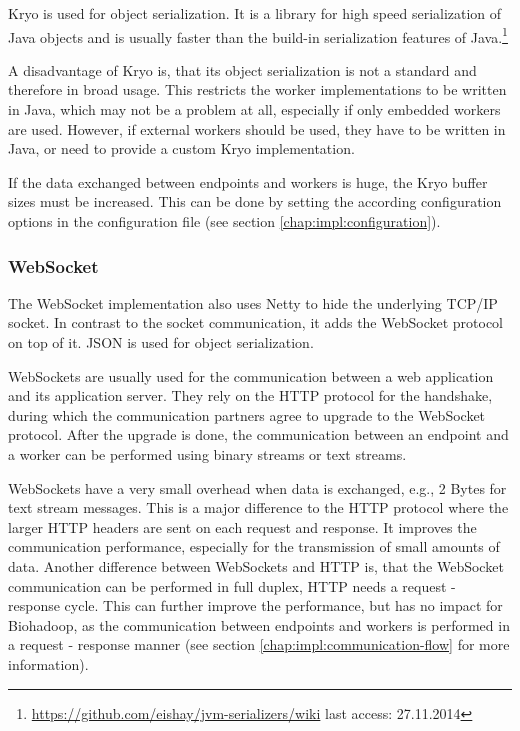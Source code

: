 Kryo is used for object serialization. It is a library for high speed serialization of Java objects and is usually faster than the build-in serialization features of Java.\footnote{\url{https://github.com/eishay/jvm-serializers/wiki} last access: 27.11.2014}

A disadvantage of Kryo is, that its object serialization is not a standard and therefore in broad usage. This restricts the worker implementations to be written in Java, which may not be a problem at all, especially if only embedded workers are used. However, if external workers should be used, they have to be written in Java, or need to provide a custom Kryo implementation.

If the data exchanged between endpoints and workers is huge, the Kryo buffer sizes must be increased. This can be done by setting the according configuration options in the configuration file (see section \ref{chap:impl:configuration}).

\subsubsection{WebSocket}
The WebSocket implementation also uses Netty to hide the underlying TCP/IP socket. In contrast to the socket communication, it adds the WebSocket protocol on top of it. JSON is used for object serialization.

WebSockets are usually used for the communication between a web application and its application server. They rely on the HTTP protocol for the handshake, during which the communication partners agree to upgrade to the WebSocket protocol. After the upgrade is done, the communication between an endpoint and a worker can be performed using binary streams or text streams.

WebSockets have a very small overhead when data is exchanged, e.g., 2 Bytes for text stream messages. This is a major difference to the HTTP protocol where the larger HTTP headers are sent on each request and response. It improves the communication performance, especially for the transmission of small amounts of data. Another difference between WebSockets and HTTP is, that the WebSocket communication can be performed in full duplex, HTTP needs a request - response cycle. This can further improve the performance, but has no impact for Biohadoop, as the communication between endpoints and workers is performed in a request - response manner (see section \ref{chap:impl:communication-flow} for more information).

